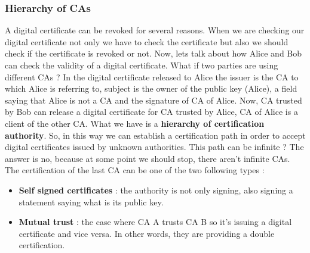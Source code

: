 \documentclass[11pt]{article}
\begin{document}
\subsubsection{Hierarchy of CAs}
A digital certificate can be revoked for several reasons. When we are checking our digital certificate not only we have to check the certificate but also we should check if the certificate is revoked or not. Now, lets talk about how Alice and Bob can check the validity of a digital certificate. What if two parties are using different CAs ? In the digital certificate released to Alice the issuer is the CA to which Alice is referring to, subject is the owner of the public key (Alice), a field saying that Alice is not a CA and the signature
of CA of Alice. Now, CA trusted by Bob can release a digital certificate for CA trusted by Alice, CA of Alice is a client of the other CA. What we have is a \textbf{hierarchy of certification authority}. So, in this way we can establish a certification path in order to accept digital certificates issued by unknown authorities. This path can be infinite ? The answer is no, because at some point we should stop, there aren't infinite CAs. The certification of the last CA can be one of the two following types : 
\begin{itemize}
\item \textbf{Self signed certificates} : the authority is not only signing, also signing a statement saying what is its public key.
\item \textbf{Mutual trust} : the case where CA A trusts CA B so it's issuing a digital certificate and vice versa. In other words, they are providing a double certification.
\end{itemize} 
\end{document}
